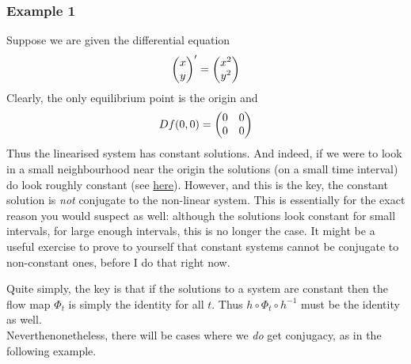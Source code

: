 \subsubsection{Example 1}
Suppose we are given the differential equation
$$ \begin{pmatrix} x\\y \end{pmatrix}' = \begin{pmatrix} x^2 \\ y^2 \end{pmatrix} $$
Clearly, the only equilibrium point is the origin and 
$$ Df(0, 0) = \begin{pmatrix} 0 & 0\\0 & 0 \end{pmatrix} $$
Thus the linearised system has constant solutions. And indeed, if we were to look in a small neighbourhood near the origin the solutions (on a small time interval) do look roughly constant (see \href{https://anvaka.github.io/fieldplay/?dt=0.02&fo=0.995&dp=0.009&cm=1&cx=-0.08204999999999996&cy=0.01435000000000003&w=3.0423&h=3.0423&vf=\%2F\%2F\%20p.x\%20and\%20p.y\%20are\%20current\%20coordinates\%0A\%2F\%2F\%20v.x\%20and\%20v.y\%20is\%20a\%20velocity\%20at\%20point\%20p\%0Avec2\%20get_velocity\%28vec2\%20p\%29\%20\%7B\%0A\%20\%20vec2\%20v\%20\%3D\%20vec2\%280.\%2C\%200.\%29\%3B\%0A\%0A\%20\%20\%2F\%2F\%20change\%20this\%20to\%20get\%20a\%20new\%20vector\%20field\%0A\%20\%20v.x\%20\%3D\%20p.x\%20*\%20p.x\%3B\%0A\%20\%20v.y\%20\%3D\%20p.y\%20*\%20p.y\%3B\%0A\%0A\%20\%20return\%20v\%3B\%0A\%7D&pc=10000&code=\%2F\%2F\%20p.x\%20and\%20p.y\%20are\%20current\%20coordinates\%0A\%2F\%2F\%20v.x\%20and\%20v.y\%20is\%20a\%20velocity\%20at\%20point\%20p\%0Avec2\%20get_velocity\%28vec2\%20p\%29\%20\%7B\%0A\%20\%20vec2\%20v\%20\%3D\%20vec2\%280.\%2C\%200.\%29\%3B\%0A\%0A\%20\%20\%2F\%2F\%20change\%20this\%20to\%20get\%20a\%20new\%20vector\%20field\%0A\%20\%20v.x\%20\%3D\%20p.x\%20*\%20p.x\%3B\%0A\%20\%20v.y\%20\%3D\%20p.y\%20*\%20p.y\%3B\%0A\%0A\%20\%20return\%20v\%3B\%0A\%7D}{here}). However, and this is the key, the constant solution is \textit{not} conjugate to the non-linear system. This is essentially for the exact reason you would suspect as well: although the solutions look constant for small intervals, for large enough intervals, this is no longer the case. It might be a useful exercise to prove to yourself that constant systems cannot be conjugate to non-constant ones, before I do that right now.

Quite simply, the key is that if the solutions to a system are constant then the flow map $\Phi_t$ is simply the identity for all $t$. Thus $h \circ \Phi_t \circ h^{-1}$ must be the identity as well.\\


Neverthenonetheless, there will be cases where we \textit{do} get conjugacy, as in the following example.

